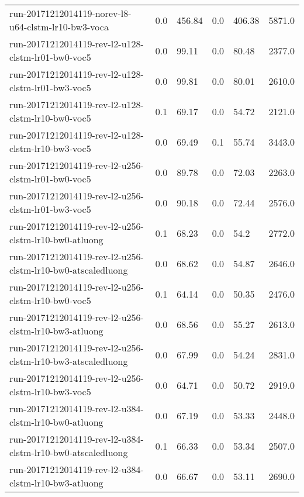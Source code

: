 \begin{landscape}
\begin{longtable}{p{.47\textheight} p{.08\textheight} p{.08\textheight} p{.08\textheight} p{.08\textheight} p{.08\textheight}}
    run-20171212014119-norev-l8-u64-clstm-lr10-bw3-voca & \num{0.0} & \num{456.84} & \num{0.0} & \num{406.38} & \num{5871.0}\\
    run-20171212014119-rev-l2-u128-clstm-lr01-bw0-voc5 & \num{0.0} & \num{99.11} & \num{0.0} & \num{80.48} & \num{2377.0}\\
    run-20171212014119-rev-l2-u128-clstm-lr01-bw3-voc5 & \num{0.0} & \num{99.81} & \num{0.0} & \num{80.01} & \num{2610.0}\\
    run-20171212014119-rev-l2-u128-clstm-lr10-bw0-voc5 & \num{0.1} & \num{69.17} & \num{0.0} & \num{54.72} & \num{2121.0}\\
    run-20171212014119-rev-l2-u128-clstm-lr10-bw3-voc5 & \num{0.0} & \num{69.49} & \num{0.1} & \num{55.74} & \num{3443.0}\\
    run-20171212014119-rev-l2-u256-clstm-lr01-bw0-voc5 & \num{0.0} & \num{89.78} & \num{0.0} & \num{72.03} & \num{2263.0}\\
    run-20171212014119-rev-l2-u256-clstm-lr01-bw3-voc5 & \num{0.0} & \num{90.18} & \num{0.0} & \num{72.44} & \num{2576.0}\\
    run-20171212014119-rev-l2-u256-clstm-lr10-bw0-atluong & \num{0.1} & \num{68.23} & \num{0.0} & \num{54.2} & \num{2772.0}\\
    run-20171212014119-rev-l2-u256-clstm-lr10-bw0-atscaledluong & \num{0.0} & \num{68.62} & \num{0.0} & \num{54.87} & \num{2646.0}\\
    run-20171212014119-rev-l2-u256-clstm-lr10-bw0-voc5 & \num{0.1} & \num{64.14} & \num{0.0} & \num{50.35} & \num{2476.0}\\
    run-20171212014119-rev-l2-u256-clstm-lr10-bw3-atluong & \num{0.0} & \num{68.56} & \num{0.0} & \num{55.27} & \num{2613.0}\\
    run-20171212014119-rev-l2-u256-clstm-lr10-bw3-atscaledluong & \num{0.0} & \num{67.99} & \num{0.0} & \num{54.24} & \num{2831.0}\\
    run-20171212014119-rev-l2-u256-clstm-lr10-bw3-voc5 & \num{0.0} & \num{64.71} & \num{0.0} & \num{50.72} & \num{2919.0}\\
    run-20171212014119-rev-l2-u384-clstm-lr10-bw0-atluong & \num{0.0} & \num{67.19} & \num{0.0} & \num{53.33} & \num{2448.0}\\
    run-20171212014119-rev-l2-u384-clstm-lr10-bw0-atscaledluong & \num{0.1} & \num{66.33} & \num{0.0} & \num{53.34} & \num{2507.0}\\
    run-20171212014119-rev-l2-u384-clstm-lr10-bw3-atluong & \num{0.0} & \num{66.67} & \num{0.0} & \num{53.11} & \num{2690.0}\\

\end{longtable}
\end{landscape}
